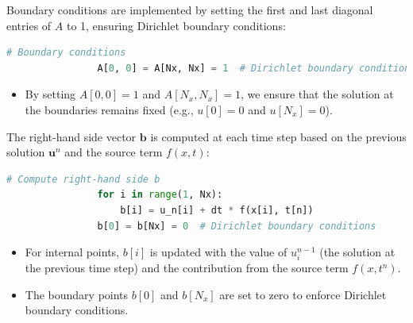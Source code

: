 \documentclass{article}
\begin{document}

			
			Boundary conditions are implemented by setting the first and last diagonal entries of \( A \) to 1, ensuring Dirichlet boundary conditions:
			
			\begin{lstlisting}[language=Python]
				# Boundary conditions
				A[0, 0] = A[Nx, Nx] = 1  # Dirichlet boundary conditions
			\end{lstlisting}
			
			\begin{itemize}
				\item By setting \( A[0, 0] = 1 \) and \( A[N_x, N_x] = 1 \), we ensure that the solution at the boundaries remains fixed (e.g., \( u[0] = 0 \) and \( u[N_x] = 0 \)).

			\end{itemize}
			
			The right-hand side vector \( \mathbf{b} \) is computed at each time step based on the previous solution \( \mathbf{u}^n \) and the source term \( f(x, t) \):
			
			\begin{lstlisting}[language=Python]
				# Compute right-hand side b
				for i in range(1, Nx):
					b[i] = u_n[i] + dt * f(x[i], t[n])
				b[0] = b[Nx] = 0  # Dirichlet boundary conditions
			\end{lstlisting}
			
			\begin{itemize}
				\item For internal points, \( b[i] \) is updated with the value of \( u_i^{n-1} \) (the solution at the previous time step) and the contribution from the source term \( f(x, t^n) \).
				\item The boundary points \( b[0] \) and \( b[N_x] \) are set to zero to enforce Dirichlet boundary conditions.
			\end{itemize}
			
\end{document}
